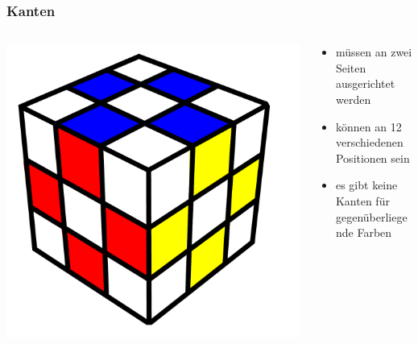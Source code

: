 \begin{frame}
	\frametitle{Kanten}
	
	\begin{columns}[c]
		\begin{column}[C]{.5\textwidth}
			\center
			\includegraphics[scale=0.3]{img/nodes}
		\end{column}
		\begin{column}[C]{.5\textwidth}
			\begin{itemize}
				\item müssen an zwei Seiten ausgerichtet werden
				\item können an 12 verschiedenen Positionen sein
				\item es gibt keine Kanten für gegenüberliegende Farben
			\end{itemize}
		\end{column}
	\end{columns}	
	
\end{frame}

